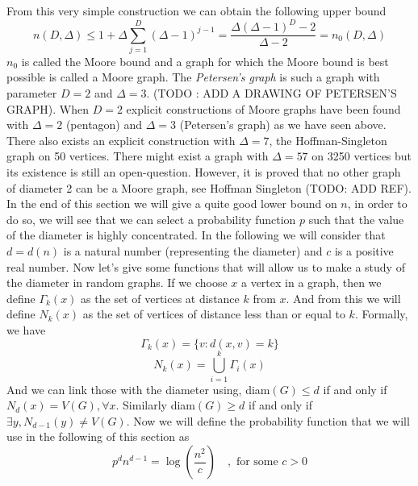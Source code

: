 From this very simple construction we can obtain the following upper bound
\begin{equation}
	n(D, \Delta) \leq 1 + \Delta \sum_{j=1}^{D}(\Delta - 1)^{j-1} = \frac{\Delta(\Delta - 1)^D - 2}{\Delta - 2} = n_0(D, \Delta)
\end{equation}
$n_0$ is called the Moore bound and a graph for which the Moore bound is best possible is called a Moore graph. 
The \emph{Petersen's graph} is such a graph with parameter $D= 2$ and $\Delta = 3$. (TODO : ADD A DRAWING OF PETERSEN'S GRAPH).
\newline
When $D=2$ explicit constructions of Moore graphs have been found with $\Delta = 2$ (pentagon) and $\Delta = 3$ (Petersen's graph) as we have seen above.
There also exists an explicit construction with $\Delta = 7$, the Hoffman-Singleton graph on 50 vertices.
There might exist a graph with $\Delta = 57$ on 3250 vertices but its existence is still an open-question.
However, it is proved that no other graph of diameter 2 can be a Moore graph, see Hoffman Singleton (TODO: ADD REF).
\newline
In the end of this section we will give a quite good lower bound on $n$, in order to do so, we will see that we can select a probability function $p$ such that the value of the diameter is highly concentrated.
\newline
In the following we will consider that $d = d(n)$ is a natural number (representing the diameter) and $c$ is a positive real number.
\newline
Now let's give some functions that will allow us to make a study of the diameter in random graphs. If we choose $x$ a vertex in a graph, then we define $\Gamma_k(x)$ as the set of vertices at distance $k$ from $x$. And from this we will define $N_k(x)$ as the set of vertices of distance less than or equal to $k$. 
Formally, we have
\begin{equation}
	\Gamma_k(x) = \{v : d(x, v) = k \}
\end{equation}
\begin{equation}
	N_k(x) = \bigcup_{i=1}^k \Gamma_i(x)
\end{equation}
And we can link those with the diameter using, diam$(G) \leq d $ if and only if $N_d(x) = V(G), \forall x$.
\newline
Similarly diam$(G) \geq d $ if and only if $\exists y, N_{d-1}(y) \neq V(G)$.
\newline
Now we will define the probability function that we will use in the following of this section as 
\begin{equation} \label{eq:pdiam}
	p^d n^{d-1} = \log(\frac{n^2}{c}) \quad, \text{  for some } c >0
\end{equation}
